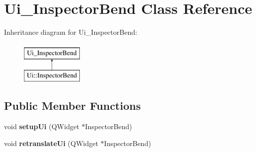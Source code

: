 \hypertarget{class_ui___inspector_bend}{}\section{Ui\+\_\+\+Inspector\+Bend Class Reference}
\label{class_ui___inspector_bend}
Inheritance diagram for Ui\+\_\+\+Inspector\+Bend\+:\begin{figure}[H]
\begin{center}
\leavevmode
\includegraphics[height=2.000000cm]{class_ui___inspector_bend}
\end{center}
\end{figure}
\subsection*{Public Member Functions}
\begin{DoxyCompactItemize}
\item 
\mbox{\label{class_ui___inspector_bend_aeb2014859d8e7e6690ec7aeffbd27bea}} 
void {\bfseries setup\+Ui} (Q\+Widget $\ast$Inspector\+Bend)
\item 
\mbox{\label{class_ui___inspector_bend_acd9a3a7f9b317e8603653b9f5617df1a}} 
void {\bfseries retranslate\+Ui} (Q\+Widget $\ast$Inspector\+Bend)
\end{DoxyCompactItemize}

